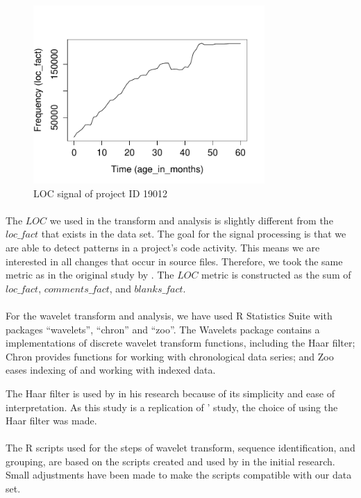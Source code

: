 \begin{figure}[h]
\caption{LOC signal of project ID 19012}\label{figure:signal}
\centering
	\includegraphics[height=192pt]{figures/signal_pid_19012.pdf}
\end{figure}

\paragraph{}
The $LOC$ we used in the transform and analysis is slightly different from the
$loc\_fact$ that exists in the data set. The goal for the signal processing is
that we are able to detect patterns in a project's code activity. This means we
are interested in all changes that occur in source files. Therefore, we took
the same metric as in the original study by \citet{karus2013}. The $LOC$ metric
is constructed as the sum of $loc\_fact$, $comments\_fact$, and $blanks\_fact$.

\paragraph{}
For the wavelet transform and analysis, we have used R Statistics Suite
with packages ``wavelets'', ``chron'' and ``zoo''. The Wavelets package
contains a implementations of discrete wavelet transform functions, including
the Haar filter; Chron provides functions for working with chronological data
series; and Zoo eases indexing of and working with indexed data.

The Haar filter is used by \citet{karus2013} in his research because of its
simplicity and ease of interpretation. As this study is a replication of
\citeauthor{karus2013}' study, the choice of using the Haar filter was made.

\paragraph{}
The R scripts used for the steps of wavelet transform, sequence identification,
and grouping, are based on the scripts created and used by
\citeauthor{karus2013} in the initial research. Small adjustments have been
made to make the scripts compatible with our data set.

